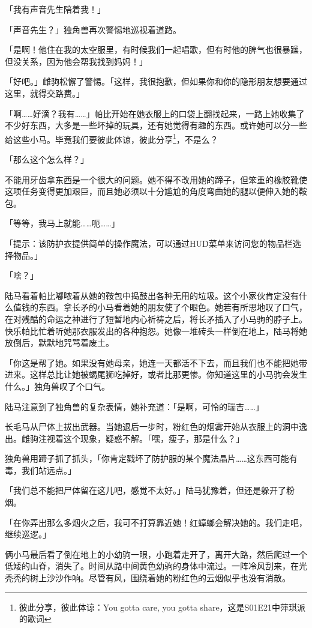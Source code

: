 「我有声音先生陪着我！」

「声音先生？」独角兽再次警惕地巡视着道路。

「是啊！他住在我的太空服里，有时候我们一起唱歌，但有时他的脾气也很暴躁，但没关系，因为他会帮我找到妈妈！」

「好吧。」雌驹松懈了警惕。「这样，我很抱歉，但如果你和你的隐形朋友想要通过这里，就得交路费。」

「啊……好滴？我有……」帕比开始在她衣服上的口袋上翻找起来，一路上她收集了不少好东西，大多是一些坏掉的玩具，还有她觉得有趣的东西。或许她可以分一些给这些小马。毕竟我们要彼此体谅，彼此分享\footnote{彼此分享，彼此体谅：You gotta care, you gotta share，这是S01E21中萍琪派的歌词}，不是么？

「那么这个怎么样？」

不能用牙齿拿东西是一个很大的问题。她不得不改用她的蹄子，但笨重的橡胶靴使这项任务变得更加艰巨，而且她必须以十分尴尬的角度弯曲她的腿以便伸入她的鞍包。

「等等，我马上就能……呃……」

「{\mt 提示：该防护衣提供简单的操作魔法，可以通过HUD菜单来访问您的物品栏选择物品。}」

「啥？」

陆马看着帕比嘟哝着从她的鞍包中捣鼓出各种无用的垃圾。这个小家伙肯定没有什么值钱的东西。拿长矛的小马看着她的朋友使了个眼色。她若有所思地叹了口气，在对残酷的命运之神进行了短暂地内心祈祷之后，将长矛插入了小马驹的脖子上。快乐帕比忙着听她那衣服发出的各种抱怨。她像一堆砖头一样倒在地上，陆马将她放倒后，默默地咒骂着废土。

「你这是帮了她。如果没有她母亲，她连一天都活不下去，而且我们也不能把她带进来。这样总比让她被蝎尾狮吃掉好，或者比那更惨。你知道这里的小马驹会发生什么。」独角兽叹了个口气。

陆马注意到了独角兽的复杂表情，她补充道：「是啊，可怜的瑞吉……」

长毛马从尸体上拔出武器。当她退后一步时，粉红色的烟雾开始从衣服上的洞中逸出。雌驹注视着这个现象，疑惑不解。「嘿，瘦子，那是什么？」

独角兽用蹄子抓了抓头，「你肯定戳坏了防护服的某个魔法晶片……这东西可能有毒，我们站远点。」

「我们总不能把尸体留在这儿吧，感觉不太好。」陆马犹豫着，但还是躲开了粉烟。

「在你弄出那么多烟火之后，我可不打算靠近她！红蟑螂会解决她的。我们走吧，继续巡逻。」

俩小马最后看了倒在地上的小幼驹一眼，小跑着走开了，离开大路，然后爬过一个低矮的山脊，消失了。时间从路中间黄色幼驹的身体中流过。一阵冷风刮来，在光秃秃的树上沙沙作响。尽管有风，围绕着她的粉红色的云烟似乎也没有消散。

